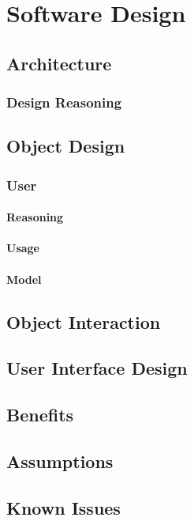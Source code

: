 \chapter{Software Design}
\label{chap:software_design}

\section{Architecture}

\subsection{Design Reasoning}

\section{Object Design}

\subsection{User}

\subsubsection{Reasoning}

\subsubsection{Usage}

\subsubsection{Model}

\section{Object Interaction}

\section{User Interface Design}

\section{Benefits}

\section{Assumptions}

\section{Known Issues}
